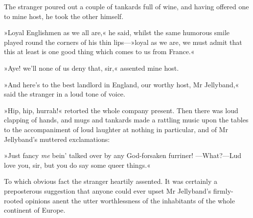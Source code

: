 The stranger poured out a couple of tankards full of wine, and having offered one to mine host, he took the other himself.

»Loyal Englishmen as we all are,« he said, whilst the same humorous smile played round the corners of his thin lips—»loyal as we are, we must admit that this at least is one good thing which comes to us from France.«

»Aye! we'll none of us deny that, sir,« assented mine host.

»And here's to the best landlord in England, our worthy host, Mr Jellyband,« said the stranger in a loud tone of voice.

»Hip, hip, hurrah!« retorted the whole company present. Then there was loud clapping of hands, and mugs and tankards made a rattling music upon the tables to the accompaniment of loud laughter at nothing in particular, and of Mr Jellyband's muttered exclamations:

»Just fancy \textit{me} bein' talked over by any God-forsaken furriner! —What?—Lud love you, sir, but you do say some queer things.«

To which obvious fact the stranger heartily assented. It was certainly a preposterous suggestion that anyone could ever upset Mr Jellyband's firmly-rooted opinions anent the utter worthlessness of the inhabitants of the whole continent of Europe.